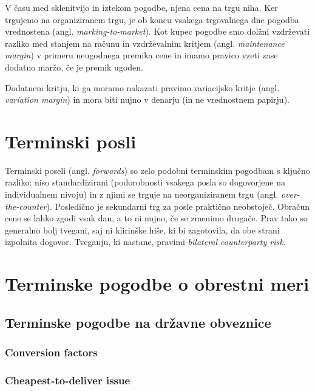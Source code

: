 \documentclass[a4paper, 12pt]{article}
\begin{document}
V času med sklenitvijo in iztekom pogodbe, njena cena na trgu niha. Ker trgujemo na organiziranem
trgu, je ob koncu vsakega trgovalnega dne pogodba vrednostena (angl. \textit{marking-to-market}). 
Kot kupec pogodbe smo dolžni vzdrževati razliko med stanjem na računu in vzdrževalnim kritjem
(angl. \textit{maintenance margin}) v primeru neugodnega premika cene in imamo pravico vzeti zase 
dodatno maržo, če je premik ugoden. 

Dodatnem kritju, ki ga moramo nakazati pravimo variacijsko kritje (angl. \textit{variation margin}) 
in mora biti nujno v denarju (in ne vrednostnem papirju).

\section{Terminski posli}
Terminski poseli (angl. \textit{forwards}) so zelo podobni terminskim pogodbam s ključno razliko:
niso standardizirani (podorobnosti vsakega posla so dogovorjene na individualnem nivoju) in z njimi
se trguje na neorganiziranem trgu (angl. \textit{over-the-counter}). Posledično je sekundarni trg za 
posle praktično neobstoječ. Obračun cene se lahko zgodi vsak dan, a to ni nujno, če se zmenimo drugače.
Prav tako so generalno bolj tvegani, saj ni klirinške hiše, ki bi zagotovila, da obe strani izpolnita
dogovor. Tveganju, ki nastane, pravimi \textit{bilateral counterparty risk.}

% 

\section{Terminske pogodbe o obrestni meri}
\subsection{Terminske pogodbe na državne obveznice}
\subsubsection{Conversion factors}
\subsubsection{Cheapest-to-deliver issue}
\end{document}
